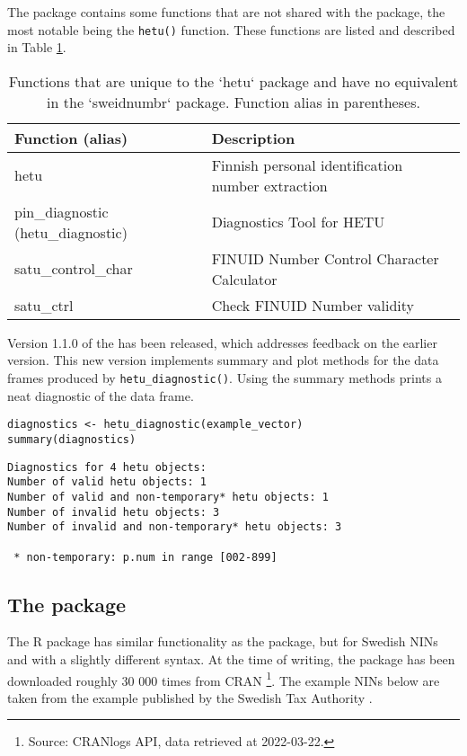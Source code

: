 The  package contains some functions that are not shared with the  package, the most notable being the \texttt{hetu()} function. These functions are listed and described in Table \ref{tab:hetu-function-table}.

\begin{table}[!h]
\centering
\caption{\label{tab:hetu-function-table}Functions that are unique to the `hetu` package and have no equivalent in the `sweidnumbr` package. Function alias in parentheses.}
\centering
\begin{tabular}[t]{ll}
\toprule
Function (alias) & Description\\
\midrule
hetu & Finnish personal identification number extraction\\
pin\_diagnostic (hetu\_diagnostic) & Diagnostics Tool for HETU\\
satu\_control\_char & FINUID Number Control Character Calculator\\
satu\_ctrl & Check FINUID Number validity\\
\bottomrule
\end{tabular}
\end{table}

Version 1.1.0 of the  has been released, which addresses feedback on the earlier version. This new version implements summary and plot methods for the data frames produced by \texttt{hetu\_diagnostic()}. Using the summary methods prints a neat diagnostic of the data frame.

\begin{verbatim}
diagnostics <- hetu_diagnostic(example_vector)
summary(diagnostics)
\end{verbatim}

\begin{verbatim}
Diagnostics for 4 hetu objects: 
Number of valid hetu objects: 1 
Number of valid and non-temporary* hetu objects: 1 
Number of invalid hetu objects: 3 
Number of invalid and non-temporary* hetu objects: 3 

 * non-temporary: p.num in range [002-899]
\end{verbatim}

\subsection{The  package}

The  R package has similar functionality as the  package, but for Swedish NINs and with a slightly different syntax. At the time of writing, the package has been downloaded roughly 30 000 times from CRAN \footnote{Source: CRANlogs API, data retrieved at 2022-03-22.}. The example NINs below are taken from the example published by the Swedish Tax Authority \citep{sv2007}.


